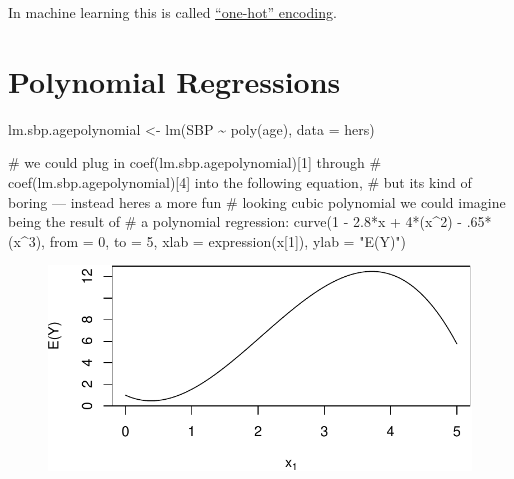 \documentclass[
  letterpaper,
  DIV=11,
  numbers=noendperiod]{scrreport}
\newenvironment{Shaded}{\begin{snugshade}}{\end{snugshade}}
\newcommand{\AttributeTok}[1]{\textcolor[rgb]{0.40,0.45,0.13}{#1}}
\newcommand{\CommentTok}[1]{\textcolor[rgb]{0.37,0.37,0.37}{#1}}
\newcommand{\DecValTok}[1]{\textcolor[rgb]{0.68,0.00,0.00}{#1}}
\newcommand{\FloatTok}[1]{\textcolor[rgb]{0.68,0.00,0.00}{#1}}
\newcommand{\FunctionTok}[1]{\textcolor[rgb]{0.28,0.35,0.67}{#1}}
\newcommand{\NormalTok}[1]{\textcolor[rgb]{0.00,0.23,0.31}{#1}}
\newcommand{\OtherTok}[1]{\textcolor[rgb]{0.00,0.23,0.31}{#1}}
\newcommand{\SpecialCharTok}[1]{\textcolor[rgb]{0.37,0.37,0.37}{#1}}
\newcommand{\StringTok}[1]{\textcolor[rgb]{0.13,0.47,0.30}{#1}}
\begin{document}
In machine learning this is called
\href{https://en.wikipedia.org/wiki/One-hot}{``one-hot'' encoding}.

\hypertarget{polynomial-regressions}{%
\section{Polynomial Regressions}\label{polynomial-regressions}}

\begin{Shaded}
\begin{Highlighting}[]
\NormalTok{lm.sbp.agepolynomial }\OtherTok{\textless{}{-}} \FunctionTok{lm}\NormalTok{(SBP }\SpecialCharTok{\textasciitilde{}} \FunctionTok{poly}\NormalTok{(age), }\AttributeTok{data =}\NormalTok{ hers)}

\CommentTok{\# we could plug in coef(lm.sbp.agepolynomial)[1] through }
\CommentTok{\# coef(lm.sbp.agepolynomial)[4] into the following equation, }
\CommentTok{\# but it\textquotesingle{}s kind of boring — instead here\textquotesingle{}s a more fun }
\CommentTok{\# looking cubic polynomial we could imagine being the result of}
\CommentTok{\# a polynomial regression:}
\FunctionTok{curve}\NormalTok{(}\DecValTok{1} \SpecialCharTok{{-}} \FloatTok{2.8}\SpecialCharTok{*}\NormalTok{x }\SpecialCharTok{+} \DecValTok{4}\SpecialCharTok{*}\NormalTok{(x}\SpecialCharTok{\^{}}\DecValTok{2}\NormalTok{) }\SpecialCharTok{{-}}\NormalTok{ .}\DecValTok{65}\SpecialCharTok{*}\NormalTok{(x}\SpecialCharTok{\^{}}\DecValTok{3}\NormalTok{), }\AttributeTok{from =} \DecValTok{0}\NormalTok{, }\AttributeTok{to =} \DecValTok{5}\NormalTok{,}
      \AttributeTok{xlab =} \FunctionTok{expression}\NormalTok{(x[}\DecValTok{1}\NormalTok{]),}
      \AttributeTok{ylab =} \StringTok{"E(Y)"}\NormalTok{)}
\end{Highlighting}
\end{Shaded}

\begin{figure}[H]

{\centering \includegraphics{week1/week1_files/figure-pdf/unnamed-chunk-9-1.pdf}

}

\end{figure}
\end{document}
